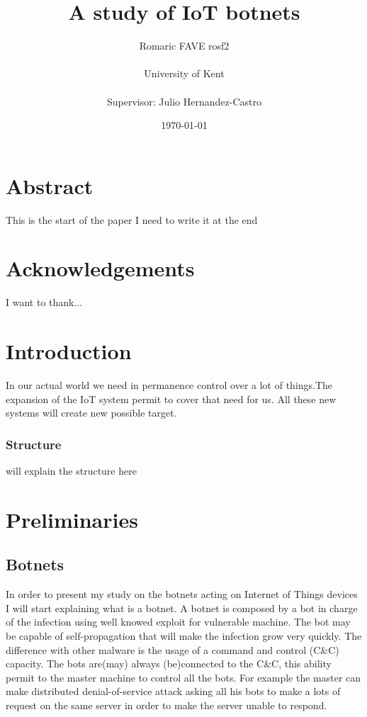 \documentclass{report}
\date{\monthyeardate\today}
\begin{document}
\title{A study of IoT botnets}
\author{Romaric FAVE rosf2\\
  \\
  University of Kent\\
  \\
  Supervisor: Julio Hernandez-Castro
}

\maketitle

\tableofcontents

\chapter*{Abstract}
This is the start of the paper I need to write it at the end

\chapter*{Acknowledgements}
I want to thank...

\chapter{Introduction}
In our actual world we need in permanence control over a lot of things.The expansion of the IoT system permit to cover that need for us. All these new systems will create new possible target.

\subsection{Structure}
will explain the structure here

\chapter{Preliminaries}
\section{Botnets}
In order to present my study on the botnets acting on Internet of Things devices I will start explaining what is a botnet. A botnet is composed by a bot in charge of the infection using well knowed exploit for vulnerable machine. The bot may be capable of self-propagation that will make the infection grow very quickly. The difference with other malware is the usage of a command and control (C\&C) capacity. The bots are(may) always (be)connected to the C\&C, this ability permit to the master machine to control all the bots. For example the master can make distributed denial-of-service attack asking all his bots to make a lots of request on the same server in order to make the server unable to respond.
\end{document}
